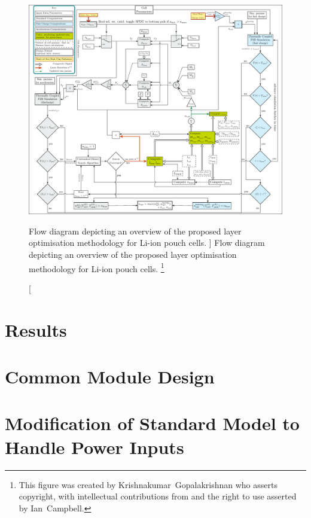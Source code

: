 \begin{figure}[p]
    \begin{minipage}[t]{\textwidth}
        \centering
        \includegraphics[angle=90, width=\textwidth]{fig_master_flow_diagram}
        \caption
        [%
        Flow diagram depicting an overview of the proposed layer optimisation methodology
        for Li-ion pouch cells.
        ]%
        {%
            Flow diagram depicting an overview of the proposed layer optimisation methodology
            for Li-ion pouch cells\footnotemark.
        }%
        \label{fig:fig_strategy_schematic}
        \mpfootnotes[1]
        \vspace*{0.7225cm}
        \footnote{This figure was created by \mbox{Krishnakumar Gopalakrishnan} who
            asserts copyright, with intellectual contributions from and the right to
        use asserted by \mbox{Ian Campbell}.}
    \end{minipage}
\end{figure}
\section{Results}\label{sec:resultslayeropt}
\section{Common Module Design}\label{sec:commonmodulelayeropt}
\section{Modification of Standard  Model to Handle Power Inputs}\label{sec:innatepowerinput}

